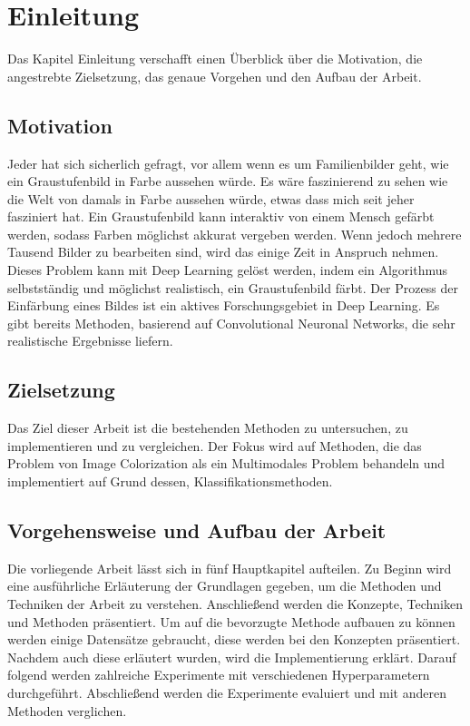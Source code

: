 \chapter{Einleitung}
Das Kapitel Einleitung verschafft einen Überblick über die Motivation, die angestrebte Zielsetzung, das
genaue Vorgehen und den Aufbau der Arbeit.

\section{Motivation}
Jeder hat sich sicherlich gefragt, vor allem wenn es um Familienbilder geht, wie
ein Graustufenbild in Farbe aussehen würde. Es wäre faszinierend zu sehen wie die Welt von damals
in Farbe aussehen würde, etwas dass mich seit jeher fasziniert hat. Ein Graustufenbild kann
interaktiv von einem Mensch gefärbt werden, sodass Farben möglichst akkurat
vergeben werden. Wenn jedoch mehrere Tausend Bilder zu bearbeiten sind, wird das einige
Zeit in Anspruch nehmen. Dieses Problem kann mit Deep Learning gelöst werden, indem
ein Algorithmus selbstständig und möglichst realistisch, ein Graustufenbild
färbt. Der Prozess der Einfärbung eines Bildes ist ein aktives Forschungsgebiet
in Deep Learning. Es gibt bereits Methoden, basierend auf Convolutional
Neuronal Networks, die sehr realistische Ergebnisse liefern.

\section{Zielsetzung}
Das Ziel dieser Arbeit ist die bestehenden Methoden zu untersuchen, zu implementieren und zu vergleichen. Der Fokus wird
auf Methoden, die das Problem von Image Colorization als ein Multimodales Problem behandeln und implementiert auf Grund dessen, 
Klassifikationsmethoden.

\section{Vorgehensweise und Aufbau der Arbeit}
Die vorliegende Arbeit lässt sich in fünf Hauptkapitel aufteilen. Zu Beginn wird eine ausführliche Erläuterung der Grundlagen gegeben,
um die Methoden und Techniken der Arbeit zu verstehen. Anschließend werden die Konzepte, Techniken und Methoden präsentiert.
Um auf die bevorzugte Methode aufbauen zu können werden einige Datensätze gebraucht, diese werden bei den Konzepten präsentiert.
Nachdem auch diese erläutert wurden, wird die Implementierung erklärt. Darauf folgend werden zahlreiche Experimente mit verschiedenen
Hyperparametern durchgeführt. Abschließend werden die Experimente evaluiert und mit anderen Methoden verglichen.
